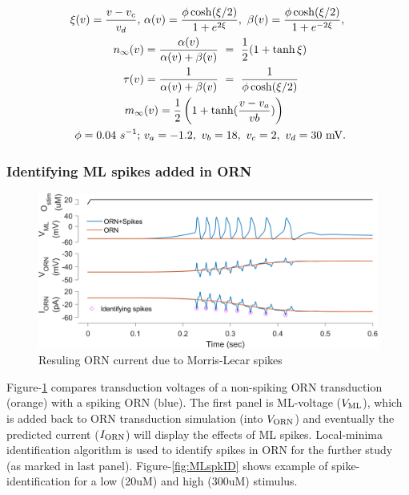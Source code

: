 \documentclass[
]{article}
\begin{document}
\begin{equation} \label{eq:MLfxn}
\begin{split}
\xi(v)=\frac{v-v_c}{v_d},\ &\alpha(v)=\frac{\phi \cosh(\xi/2)}{1+ e^{2\xi}},\ \beta(v)=\frac{\phi \cosh(\xi/2)}{1+ e^{-2\xi}}, \\
n_\infty(v) &= \frac{\alpha(v)}{\alpha(v)+\beta(v)}\ =\  \frac12(1 + \tanh \xi) \\
\tau(v) &= \frac{1}{\alpha(v) + \beta(v)}\ =\  \frac{1}{\phi \cosh(\xi/2)} \\
m_\infty&(v) = \frac12\left(1+ \tanh(\frac{v-v_a}{vb})\right) \\ 
\phi=0.04\ s^{-1};\ &v_a=-1.2,\ v_b=18,\ v_c=2,\ v_d=30\ {\rm mV}.
\end{split}
\end{equation}

\hypertarget{identifying-ml-spikes-added-in-orn}{%
\subsubsection{Identifying ML spikes added in ORN}\label{identifying-ml-spikes-added-in-orn}}

\begin{figure}

{\centering \includegraphics[width=0.9\linewidth]{figs/v1/fig_ML_spikes_with_ORN} 

}

\caption{Resuling ORN current due to Morris-Lecar spikes}\label{fig:MLspkORN}
\end{figure}

Figure-\ref{fig:MLspkORN} compares transduction voltages of a non-spiking ORN transduction (orange) with a spiking ORN (blue). The first panel is ML-voltage (\(V_{\rm ML}\)), which is added back to ORN transduction simulation (into \(V_{\rm ORN}\)) and eventually the predicted current (\(I_{\rm ORN}\)) will display the effects of ML spikes. Local-minima identification algorithm is used to identify spikes in ORN for the further study (as marked in last panel). Figure-\ref{fig:MLspkID} shows example of spike-identification for a low (20uM) and high (300uM) stimulus.
\end{document}
